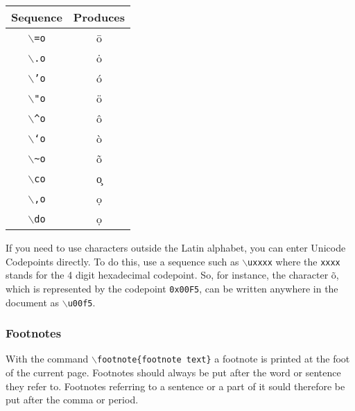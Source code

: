 \documentclass[11pt]{article}
\newcommand{\cmd}[1]{{\tt $\backslash$#1}}
\begin{document}
\vspace{0.4cm}
\begin{tabular}{c|c}
  Sequence & Produces\\
\hline
  \cmd{=o} & \=o \\
  \cmd{.o} & \.o \\
  \cmd{'o} & \'o \\
  \cmd{"o} & \"o \\
  \cmd{\textasciicircum o} & \^o \\
  \cmd{`o} & \`o \\
  \cmd{\textasciitilde o} & \~o \\
  \cmd{co} & \c{o}\\
  \cmd{,o} & \d{o}\\
  \cmd{do} & \d{o}\\
\end{tabular}
\vspace{0.4cm}

If you need to use characters outside the Latin alphabet, you can
enter Unicode Codepoints directly. To do this, use a sequence such as
\cmd{uxxxx} where the {\tt xxxx} stands for the 4 digit hexadecimal
codepoint. So, for instance, the character \~o, which is represented
by the codepoint {\tt 0x00F5}, can be written anywhere in the document
as \cmd{u00f5}.




\subsubsection{Footnotes}

With the command \cmd{footnote\{footnote text\}} a footnote is printed
at the foot of the current page. Footnotes should always be put after
the word or sentence they refer to. Footnotes referring to a sentence
or a part of it sould therefore be put after the comma or period.


\end{document}
